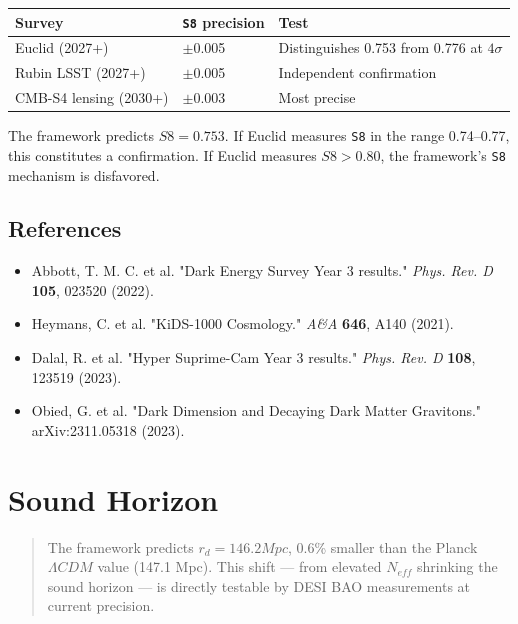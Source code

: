 \documentclass[aps,prd,preprint,superscriptaddress,longbibliography]{revtex4-2}
\begin{document}
\begin{table}[H]
\begin{ruledtabular}
\begin{tabular}{p{5.0cm}p{5.0cm}p{5.0cm}}
Survey & \texttt{S8} precision & Test \\
\hline
Euclid (2027+) & $\pm$0.005 & Distinguishes 0.753 from 0.776 at $4\sigma$ \\
Rubin LSST (2027+) & $\pm$0.005 & Independent confirmation \\
CMB-S4 lensing (2030+) & $\pm$0.003 & Most precise \\
\end{tabular}
\end{ruledtabular}
\end{table}

The framework predicts $S8 = 0.753$. If Euclid measures \texttt{S8} in the range 0.74--0.77, this constitutes a confirmation. If Euclid measures $S8 > 0.80$, the framework's \texttt{S8} mechanism is disfavored.



\subsection{References}


\begin{itemize}
  \item Abbott, T. M. C. et al. "Dark Energy Survey Year 3 results." \textit{Phys. Rev. D} \textbf{105}, 023520 (2022).
  \item Heymans, C. et al. "KiDS-1000 Cosmology." \textit{A\&A} \textbf{646}, A140 (2021).
  \item Dalal, R. et al. "Hyper Suprime-Cam Year 3 results." \textit{Phys. Rev. D} \textbf{108}, 123519 (2023).
  \item Obied, G. et al. "Dark Dimension and Decaying Dark Matter Gravitons." arXiv:2311.05318 (2023).
\end{itemize}


\section{Sound Horizon}


\begin{quote}
The framework predicts $r_d = 146.2 Mpc$, 0.6\% smaller than the
Planck $\Lambda CDM$ value (147.1 Mpc). This shift --- from elevated $N_{eff}$
shrinking the sound horizon --- is directly testable by DESI BAO
measurements at current precision.
\end{quote}
\end{document}
